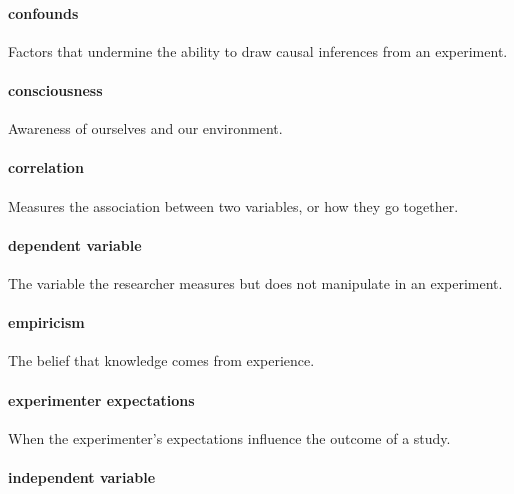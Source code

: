 \documentclass[
]{krantz}
\begin{document}
\paragraph*{confounds}\label{confounds}

Factors that undermine the ability to draw causal inferences from an experiment.

\paragraph*{consciousness}\label{consciousness}

Awareness of ourselves and our environment.

\paragraph*{correlation}\label{correlation}

Measures the association between two variables, or how they go together.

\paragraph*{dependent variable}\label{dependent-variable}

The variable the researcher measures but does not manipulate in an experiment.

\paragraph*{empiricism}\label{empiricism}

The belief that knowledge comes from experience.

\paragraph*{experimenter expectations}\label{experimenter-expectations}

When the experimenter's expectations influence the outcome of a study.

\paragraph*{independent variable}\label{independent-variable}
\end{document}
